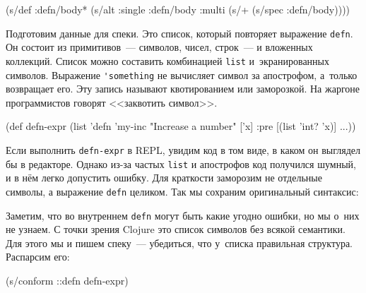 \else

\begin{english}
  \begin{clojure}
(s/def :defn/body*
  (s/alt :single :defn/body
         :multi (s/+ (s/spec :defn/body))))
  \end{clojure}
\end{english}

\fi


Подготовим данные для спеки. Это список, который повторяет выражение
\verb|defn|. Он состоит из примитивов~--- символов, чисел, строк~--- и вложенных
коллекций. Список можно составить комбинацией \verb|list| и~экранированных
символов. Выражение \verb|'something| не вычисляет символ за апострофом,
а~только возвращает его. Эту запись называют квотированием  или
заморозкой. На жаргоне программистов говорят <<заквотить символ>>.

\begin{english}
  \begin{clojure}
(def defn-expr
  (list 'defn 'my-inc
        "Increase a number"
        ['x]
        {:pre [(list 'int? 'x)]} ...))
  \end{clojure}
\end{english}

Если выполнить \verb|defn-expr| в REPL, увидим код в том виде, в каком он
выглядел бы в редакторе. Однако из-за частых \verb|list| и апострофов код
получился шумный, и в нём легко допустить ошибку. Для краткости заморозим не
отдельные символы, а выражение \verb|defn| целиком. Так мы сохраним оригинальный
синтаксис:

\begin{english}
\end{english}

Заметим, что во внутреннем \verb|defn| могут быть какие угодно ошибки, но мы
о~них не узнаем. С точки зрения Clojure это список символов без всякой
семантики. Для этого мы и пишем спеку~--- убедиться, что у~списка правильная
структура. Распарсим его:

\begin{english}
  \begin{clojure}
(s/conform ::defn defn-expr)
  \end{clojure}
\end{english}

